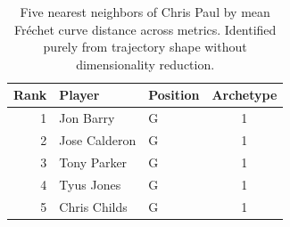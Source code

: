 \begin{table}[htbp]
  \centering\small
  \begin{tabular}{rllc}
    \toprule
    Rank & Player & Position & Archetype \\
    \midrule
    1 & Jon Barry & G & 1 \\
    2 & Jose Calderon & G & 1 \\
    3 & Tony Parker & G & 1 \\
    4 & Tyus Jones & G & 1 \\
    5 & Chris Childs & G & 1 \\
    \bottomrule
  \end{tabular}
  \caption{Five nearest neighbors of Chris Paul by mean Fr\'{e}chet curve distance across metrics. Identified purely from trajectory shape without dimensionality reduction.}
  \label{tab:Chris_Paul_frechet_curve_neighbors}
\end{table}

